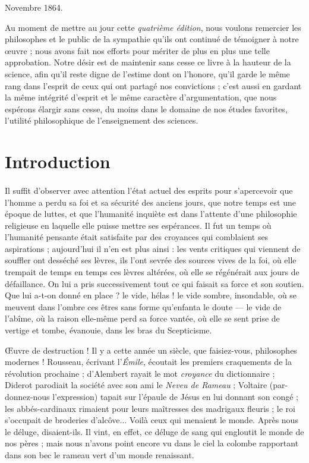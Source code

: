 \documentclass[a4paper, 11pt, oneside]{article}
\begin{document}
Novembre 1864.

\bigskip

Au moment de mettre au jour cette \emph{quatrième édition}, nous voulons remercier les philosophes et le public de la sympathie qu'ils ont continué de témoigner à notre œuvre ; nous avons fait nos efforts pour mériter de plus en plus une telle approbation. Notre désir est de maintenir sans cesse ce livre à la hauteur de la science, afin qu'il reste digne de l'estime dont on l'honore, qu'il garde le même rang dans l'esprit de ceux qui ont partagé nos convictions ; c'est aussi en gardant la même intégrité d'esprit et le même caractère d'argumentation, que nous espérons élargir sans cesse, du moins dans le domaine de nos études favorites, l'utilité philosophique de l'enseignement des sciences.
\clearpage
\section*{Introduction}
\paragraph{}
Il suffit d'observer avec attention l'état actuel des esprits pour s'apercevoir que l'homme a perdu sa foi et sa sécurité des anciens jours, que notre temps est une époque de luttes, et que l'humanité inquiète est dans l'attente d'une philosophie religieuse en laquelle elle puisse mettre ses espérances. Il fut un temps où l'humanité pensante était satisfaite par des croyances qui comblaient ses aspirations ; aujourd'hui il n'en est plus ainsi : les vents critiques qui viennent de souffler ont desséché ses lèvres, ils l'ont sevrée des sources vives de la foi, où elle trempait de temps en temps ces lèvres altérées, où elle se régénérait aux jours de défaillance. On lui a pris successivement tout ce qui faisait sa force et son soutien. Que lui a-t-on donné en place ? le vide, hélas ! le vide sombre, insondable, où se meuvent dans l'ombre ces êtres sans forme qu'enfanta le doute --- le vide de l'abîme, où la raison elle-même perd sa force vantée, où elle se sent prise de vertige et tombe, évanouie, dans les bras du Scepticisme.

Œuvre de destruction ! Il y a cette année un siècle, que faisiez-vous, philosophes modernes ! Rousseau, écrivant l'\emph{Émile}, écoutait les premiers craquements de la révolution prochaine ; d'Alembert rayait le mot \emph{croyance} du dictionnaire ; Diderot parodiait la société avec son ami le \emph{Neveu de Rameau} ; Voltaire (par-donnez-nous l'expression) tapait sur l'épaule de Jésus en lui donnant son congé ; les abbés-cardinaux rimaient pour leurs maîtresses des madrigaux fleuris ; le roi s'occupait de broderies d'alcôve... Voilà ceux qui menaient le monde. Après nous le déluge, disaient-ils. Il vint, en effet, ce déluge de sang qui engloutit le monde de nos pères ; mais nous n'avons point encore vu dans le ciel la colombe rapportant dans son bec le rameau vert d'un monde renaissant.
\end{document}
